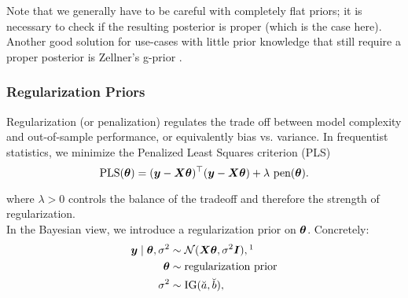 Note that we generally have to be careful with completely flat priors; it is necessary to check if the resulting posterior is proper (which is the case here).\\

Another good solution for use-cases with little prior knowledge that still require a proper posterior is Zellner's g-prior \citep{zellner_assessing_1986}.

\subsubsection*{Regularization Priors} \label{sec:lm-regularization}

Regularization (or penalization) regulates the trade off between model complexity and out-of-sample performance, or equivalently bias vs. variance. 
In frequentist statistics, we minimize the Penalized Least Squares criterion (PLS) 
\begin{equation*}
    \text{PLS}(\btheta) = (\by - \bX \btheta)^\top (\by - \bX \btheta) + \lambda \ \text{pen}(\btheta).
\end{equation*}

where $\lambda > 0$ controls the balance of the tradeoff and therefore the strength of regularization.\\

In the Bayesian view, we introduce a regularization prior on $\bm{\theta}$.
Concretely:
\begin{equation*}
    \begin{aligned}
        \by \mid \btheta, \ssd &\sim \Ncal(\bX \btheta, \ssd \bI),\footnotemark \\
        \btheta &\sim \text{regularization prior}\\
        \ssd &\sim \IG(\apri, \bpri),
    \end{aligned}
\end{equation*}



